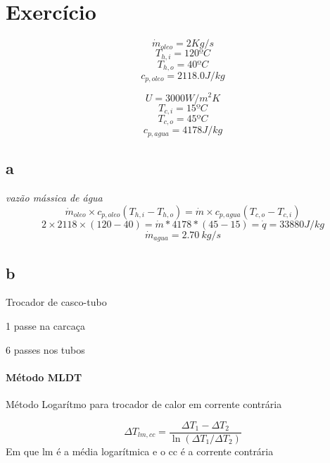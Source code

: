 \section{Exercício}



\[\dot{m}_{oleo}=2Kg/s\]
\[T_{h,i} = 120ºC\]
\[T_{h,o} = 40ºC\]
\[c_{p,oleo} = 2118.0 J/kg\]

\[U = 3000 W/m^{2}K\]
\[T_{c,i} = 15ºC\]
\[T_{c,o}= 45ºC\]
\[c_{p,agua} = 4178 J/kg\]

\subsection{a}
\textit{vazão mássica de água}
\[\dot{m}_{oleo} \times c_{p,oleo} (T_{h,i}-T_{h,o}) = \dot{m} \times c_{p,agua}(T_{c,o}-T_{c,i})\]
\[2 \times 2118 \times (120-40) = \dot{m} * 4178 * ( 45-15 ) = \dot{q}=33880J/kg\]
\[\dot{m}_{agua}=2.70 \ kg/s\]

\subsection{b}
Trocador de casco-tubo

1 passe na carcaça

6 passes nos tubos



\paragraph{Método MLDT}
Método Logarítmo para trocador de calor em corrente contrária

\[\Delta T_{lm,cc}=\frac{\Delta T_{1}-\Delta T_{2}}{\ln(\Delta T_{1}/\Delta T_{2})}\]
Em que lm é a média logarítmica e o cc é a corrente contrária

